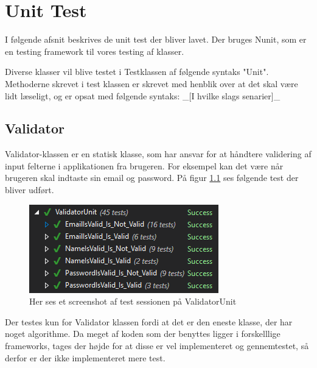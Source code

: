 \chapter{Unit Test}
I følgende afsnit beskrives de unit test der bliver lavet. Der bruges Nunit\cite{NUnit}, som er en testing framework til vores testing af klasser. 

Diverse klasser vil blive testet i Testklassen af følgende syntaks "Unit". Methoderne skrevet i test klassen er skrevet med henblik over at det skal være lidt læseligt, og er opsat med følgende syntaks: 
\_[I hvilke slags senarier]\_ 

\section{Validator}
Validator-klassen er en statisk klasse, som har ansvar for at håndtere validering af input felterne i applikationen fra brugeren. For eksempel kan det være når brugeren skal indtaste sin email og password. På figur \ref{fig:ValidatorUnit} ses følgende test der bliver udført.
\begin{figure}[H]
	\centering
	\includegraphics[width=0.6\linewidth]{Unit/ValidatorUnit.PNG}
	\caption{Her ses et screenshot af test sessionen på ValidatorUnit}
	\label{fig:ValidatorUnit}
\end{figure}
 Der testes kun for Validator klassen fordi at det er den eneste klasse, der har noget algorithme. Da meget af koden som der benyttes ligger i forskelllige frameworks, tages der højde for at disse er vel implementeret og gennemtestet, så derfor er der ikke implementeret mere test. 
\clearpage

